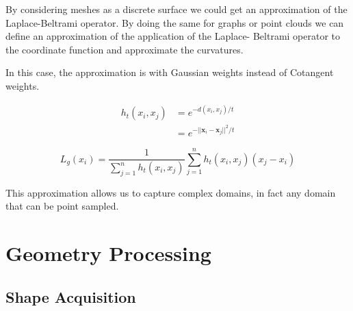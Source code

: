 \documentclass{article}
\begin{document}
\vspace{10px}

By considering meshes as a discrete surface we could get an approximation of the Laplace-Beltrami operator.
By doing the same for graphs or point clouds we can define an approximation of the application of the Laplace-
Beltrami operator to the coordinate function and approximate the curvatures.

In this case, the approximation is with Gaussian weights instead of Cotangent weights.

\vspace{10px}

\begin{minipage}{0.435\textwidth}
\end{minipage}
\hspace{-20px}\begin{minipage}{0.435\textwidth}
    \begin{align*}
        h_{t}(x_{i},x_{j}) &= e^{-d(x_{i}, x_{j}) / t}\\
        &= e^{-||\mathrm{\mathbf{x}}_i - \mathrm{\mathbf{x}}_j||^2 / t}
    \end{align*}

    \[
        L_{g}(x_{i}) = \frac{1}{\sum_{j=1}^n h_{t}(x_{i},x_{j})} \sum_{j=1}^{n} h_{t}(x_{i},x_{j}) (x_{j} - x_{i})
    \]
\end{minipage}

\vspace{10px}
This approximation allows us to capture complex domains, in fact any domain that can be point sampled.


\newpage
\section{Geometry Processing}

\subsection{Shape Acquisition}
\end{document}
